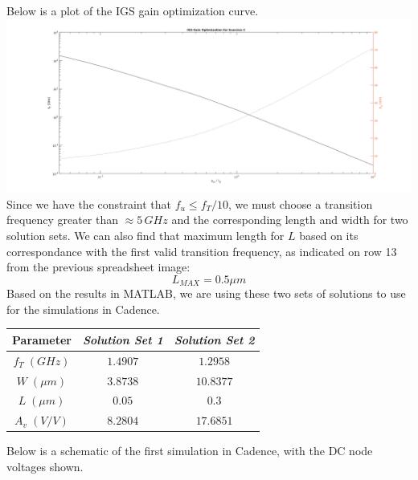\documentclass[12pt, fleqn]{article}
\begin{document}
\newpage
\noindent
Below is a plot of the IGS gain optimization curve.\\[0.25cm]
\includegraphics[scale=0.375, center]{plot3.PNG}\\[0.25cm]
Since we have the constraint that $f_u \leq f_T/10$, we must choose a transition frequency greater than $\approx 5\,GHz$ and the corresponding length and width for two solution sets.  We can also find that maximum length for $L$ based on its correspondance with the first valid transition frequency, as indicated on row 13 from the previous spreadsheet image:
\begin{equation}
    \boxed{L_{MAX} = 0.5 \mu m}
\end{equation}
Based on the results in MATLAB, we are using these two sets of solutions to use for the simulations in Cadence.
    \begin{table}[H]
    \centering
    \setlength{\tabcolsep}{20pt}
    \renewcommand{\arraystretch}{1.5}
        \begin{tabular}{|c|c|c|}
            \hline
            \textbf{Parameter} & \textit{Solution Set 1} & \textit{Solution Set 2}\\
            \hline
            $f_T\;(GHz)$ & $1.4907$ & $1.2958$\\
            \hline
            $W\;(\mu m)$ & $3.8738$ & $10.8377$\\
            \hline
            $L\;(\mu m)$ & $0.05$ & $0.3$\\
            \hline
            $A_v\;(V/V)$ & $8.2804$ & $17.6851$\\
            \hline
        \end{tabular}
    \end{table}
\newpage
\noindent
Below is a schematic of the first simulation in Cadence, with the DC node voltages shown.\\[0.25cm]
\end{document}
